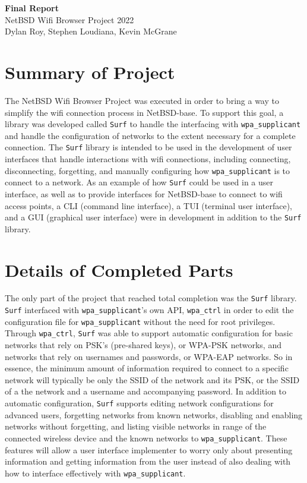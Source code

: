 \documentclass[11pt]{article}
\begin{document}
\begin{center}
  \textbf{\Large Final Report}\\\large NetBSD Wifi Browser Project 2022\\
  Dylan Roy, Stephen Loudiana, Kevin McGrane
\end{center}

\section*{Summary of Project}
The NetBSD Wifi Browser Project was executed in order to bring a way
to simplify the wifi connection process in NetBSD-base.
To support this goal, a library was developed called \texttt{Surf} to
handle the interfacing with \texttt{wpa\_supplicant} and handle the
configuration of networks to the extent necessary for a complete connection.
The \texttt{Surf} library is intended to be used in the development of
user interfaces that handle interactions with wifi connections, including
connecting, disconnecting, forgetting, and manually configuring how
\texttt{wpa\_supplicant} is to connect to a network.
As an example of how \texttt{Surf} could be used in a user interface, as
well as to provide interfaces for NetBSD-base to connect to wifi access points, 
a CLI (command line interface), a TUI (terminal user interface), and a GUI
(graphical user interface) were in development in addition to the \texttt{Surf} library.

\section*{Details of Completed Parts}
The only part of the project that reached total completion was the 
\texttt{Surf} library.
\texttt{Surf} interfaced with \texttt{wpa\_supplicant}'s own API, \texttt{wpa\_ctrl}
in order to edit the configuration file for \texttt{wpa\_supplicant} without the need
for root privileges.
Through \texttt{wpa\_ctrl}, \texttt{Surf} was able to support automatic configuration
for basic networks that rely on PSK's (pre-shared keys), or WPA-PSK networks,
and networks that rely on usernames and passwords, or WPA-EAP networks.
So in essence, the minimum amount of information required to connect to a specific 
network will typically be only the SSID of the network and its PSK, or the SSID
of a the network and a username and accompanying password.
In addition to automatic configuration, \texttt{Surf} supports editing network
configurations for advanced users, forgetting networks from known networks,
disabling and enabling networks without forgetting, and listing visible networks
in range of the connected wireless device and the known networks to \texttt{wpa\_supplicant}.
These features will allow a user interface implementer to worry only about presenting
information and getting information from the user instead of also dealing with
how to interface effectively with \texttt{wpa\_supplicant}.
\end{document}
